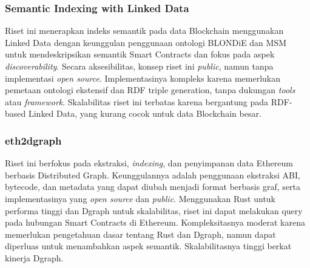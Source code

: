 



\subsubsection{Semantic Indexing with Linked Data \parencite{third2017linked}}

Riset ini menerapkan indeks semantik pada data Blockchain menggunakan Linked Data dengan keunggulan penggunaan ontologi BLONDiE dan MSM untuk mendeskripsikan semantik Smart Contracts dan fokus pada aspek \textit{discoverability}. Secara aksesibilitas, konsep riset ini \textit{public}, namun tanpa implementasi \textit{open source}. Implementasinya kompleks karena memerlukan pemetaan ontologi ekstensif dan RDF triple generation, tanpa dukungan \textit{tools} atau \textit{framework}. Skalabilitas riset ini terbatas karena bergantung pada RDF-based Linked Data, yang kurang cocok untuk data Blockchain besar.

\subsubsection{eth2dgraph \parencite{aimar2023extraction}}

Riset ini berfokus pada ekstraksi, \textit{indexing}, dan penyimpanan data Ethereum berbasis Distributed Graph. Keunggulannya adalah penggunaan ekstraksi ABI, bytecode, dan metadata yang dapat diubah menjadi format berbasis graf, serta implementasinya yang \textit{open source} dan \textit{public}. Menggunakan Rust untuk performa tinggi dan Dgraph untuk skalabilitas, riset ini dapat melakukan query pada hubungan Smart Contracts di Ethereum. Kompleksitasnya moderat karena memerlukan pengetahuan dasar tentang Rust dan Dgraph, namun dapat diperluas untuk menambahkan aspek semantik. Skalabilitasnya tinggi berkat kinerja Dgraph.

